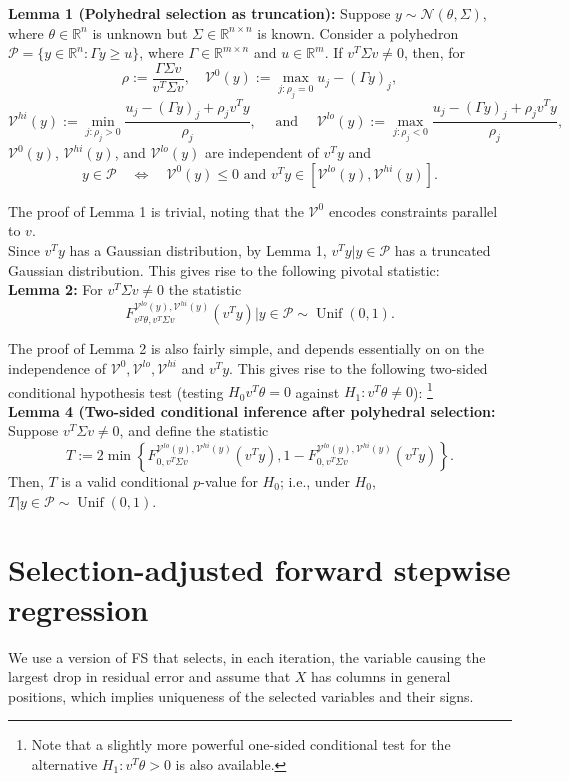 \documentclass{article}
\newcommand{\R}{\mathbb{R}}                         %
\newcommand{\V}{\mathcal{V}}
\newcommand{\poly}{\mathcal{P}}
\newcommand{\Unif}{\operatorname{Unif}}             %
\begin{document}
{\bf Lemma 1 (Polyhedral selection as truncation):}
Suppose $y \sim \mathcal{N}(\theta,\Sigma)$, where $\theta \in \R^n$ is unknown
but $\Sigma \in \R^{n \times n}$ is known. Consider a polyhedron
$\poly = \{y \in \R^n : \Gamma y \geq u \}$, where $\Gamma \in \R^{m \times n}$
and $u \in \R^m$. If $v^T \Sigma v \neq 0$, then, for
\[\rho := \frac{\Gamma \Sigma v}{v^T \Sigma v},
    \quad \V^0(y) := \max_{j : \rho_j = 0} u_j - (\Gamma y)_j,\]
\[\V^{hi}(y) := \min_{j : \rho_j > 0}
    \frac{u_j - (\Gamma y)_j + \rho_j v^T y}{\rho_j},
    \quad \mbox{ and } \quad
\V^{lo}(y) := \max_{j : \rho_j < 0}
    \frac{u_j - (\Gamma y)_j + \rho_j v^T y}{\rho_j},\]
 $\V^0(y)$, $\V^{hi}(y)$, and $\V^{lo}(y)$ are independent of $v^T y$ and
\[y \in \poly
    \quad \Leftrightarrow \quad
    \V^0(y) \leq 0
    \mbox{ and }
    v^T y \in [\V^{lo}(y), \V^{hi}(y)].\]

The proof of Lemma 1 is trivial, noting that the $\V^0$ encodes constraints
parallel to $v$. \\

Since $v^T y$ has a Gaussian distribution, by Lemma 1, $v^T y | y \in \poly$
has a truncated Gaussian distribution. This gives rise to the following pivotal
statistic: \\

{\bf Lemma 2:} For $v^T \Sigma v \neq 0$ the statistic
\[F^{\V^{lo}(y), \V^{hi}(y)}_{v^T \theta, v^T \Sigma v}(v^T y) | y \in \poly
    \sim \Unif(0,1).\]

The proof of Lemma 2 is also fairly simple, and depends essentially on on the
independence of $\V^0,\V^{lo},\V^{hi}$ and $v^T y$. This gives rise to the
following two-sided conditional hypothesis test (testing $H_0 v^T \theta = 0$
against $H_1 : v^T \theta \neq 0$):
\footnote{Note that a slightly more powerful one-sided conditional test for the
alternative $H_1 : v^T \theta > 0$ is also available.} \\

{\bf Lemma 4 (Two-sided conditional inference after polyhedral selection:}
Suppose $v^T \Sigma v \neq 0$, and define the statistic
\[T := 2 \min \left\{ F^{\V^{lo}(y),\V^{hi}(y)}_{0,v^T \Sigma v}(v^T y),
            1 - F^{\V^{lo}(y),\V^{hi}(y)}_{0,v^T \Sigma v}(v^T y) \right\}.\]
Then, $T$ is a valid conditional $p$-value for $H_0$; i.e., under $H_0$,
$T | y \in \poly \sim \Unif(0,1)$. \\

\section{Selection-adjusted forward stepwise regression}
We use a version of FS that selects, in each iteration, the variable causing
the largest drop in residual error and assume that $X$ has columns in general
positions, which implies uniqueness of the selected variables and their signs.
\end{document}
